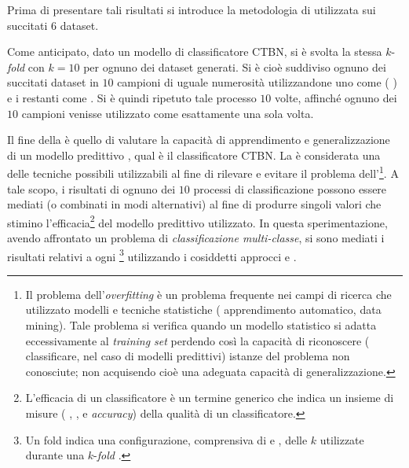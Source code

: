 Prima di presentare tali risultati si introduce la metodologia di  utilizzata sui succitati $6$ dataset.

Come anticipato, dato un modello di classificatore \acs{CTBN}, si è svolta la stessa $k$-\emph{fold } con $k = 10$ per ognuno dei dataset generati. Si è cioè suddiviso ognuno dei succitati dataset in $10$ campioni di uguale numerosità utilizzandone uno come \emph{} (\ie{} \emph{}) e i restanti come \emph{}. Si è quindi ripetuto tale processo $10$ volte, affinché ognuno dei $10$ campioni venisse utilizzato come \emph{} esattamente una sola volta.

Il fine della \emph{} è quello di valutare la capacità di apprendimento e generalizzazione di un modello predittivo \citep[si veda][capitolo $7$]{Hastie2001}, qual è il classificatore \acs{CTBN}. La \emph{} è considerata una delle tecniche possibili utilizzabili al fine di rilevare e evitare il problema dell'\emph{}\footnote{Il problema dell'\emph{overfitting} è un problema frequente nei campi di ricerca che utilizzato modelli e tecniche statistiche (\eg{} apprendimento automatico, data mining). Tale problema si verifica quando un modello statistico si adatta eccessivamente al \emph{training set} perdendo così la capacità di riconoscere (\ie{} classificare, nel caso di modelli predittivi) istanze del problema non conosciute; non acquisendo cioè una adeguata capacità di generalizzazione.}. A tale scopo, i risultati di ognuno dei $10$ processi di classificazione possono essere mediati (o combinati in modi alternativi) al fine di produrre singoli valori che stimino l'efficacia\footnote{L'efficacia di un classificatore è un termine generico che indica un insieme di misure (\eg{} \emph{}, \emph{}, \emph{} e \emph{accuracy}) della qualità di un classificatore.} del modello predittivo utilizzato. In questa sperimentazione, avendo affrontato un problema di \emph{classificazione multi-classe}, si sono mediati i risultati relativi a ogni \emph{}\footnote{Un fold indica una configurazione, comprensiva di \emph{} e \emph{}, delle $k$ utilizzate durante una $k$-\emph{fold }.} utilizzando i cosiddetti approcci \emph{} e \emph{}.

